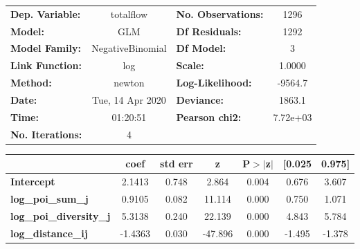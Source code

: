 \begin{center}
\begin{tabular}{lclc}
\toprule
\textbf{Dep. Variable:}         &    totalflow     & \textbf{  No. Observations:  } &     1296    \\
\textbf{Model:}                 &       GLM        & \textbf{  Df Residuals:      } &     1292    \\
\textbf{Model Family:}          & NegativeBinomial & \textbf{  Df Model:          } &        3    \\
\textbf{Link Function:}         &       log        & \textbf{  Scale:             } &    1.0000   \\
\textbf{Method:}                &      newton      & \textbf{  Log-Likelihood:    } &   -9564.7   \\
\textbf{Date:}                  & Tue, 14 Apr 2020 & \textbf{  Deviance:          } &    1863.1   \\
\textbf{Time:}                  &     01:20:51     & \textbf{  Pearson chi2:      } &  7.72e+03   \\
\textbf{No. Iterations:}        &        4         & \textbf{                     } &             \\
\bottomrule
\end{tabular}
\begin{tabular}{lcccccc}
                                & \textbf{coef} & \textbf{std err} & \textbf{z} & \textbf{P$> |$z$|$} & \textbf{[0.025} & \textbf{0.975]}  \\
\midrule
\textbf{Intercept}              &       2.1413  &        0.748     &     2.864  &         0.004        &        0.676    &        3.607     \\
\textbf{log\_poi\_sum\_j}       &       0.9105  &        0.082     &    11.114  &         0.000        &        0.750    &        1.071     \\
\textbf{log\_poi\_diversity\_j} &       5.3138  &        0.240     &    22.139  &         0.000        &        4.843    &        5.784     \\
\textbf{log\_distance\_ij}      &      -1.4363  &        0.030     &   -47.896  &         0.000        &       -1.495    &       -1.378     \\
\bottomrule
\end{tabular}
\end{center}